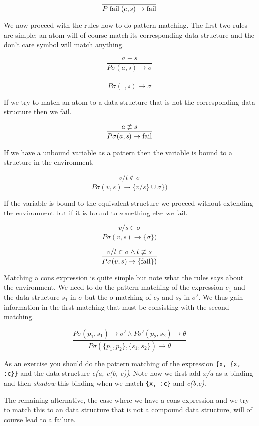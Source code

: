 \documentclass[a4paper,11pt]{article}
\begin{document}
$$\frac{}{P\;{\rm fail}\;(e, s) \rightarrow {\rm fail}}$$ 

We now proceed with the rules how to do pattern matching. The first
two rules are simple; an atom will of course match its corresponding
data structure and the don't care symbol will match anything.

$$\frac{a \equiv s}{P\sigma(a, s) \rightarrow \sigma}$$ 

$$\frac{}{P\sigma(\_,s) \rightarrow \sigma}$$

If we try to match an atom to a data structure that is not the
corresponding data structure then we fail.

$$\frac{a \not\equiv s}{P\sigma(a, s) \rightarrow {\rm fail}}$$ 

If we have a unbound variable as a pattern then the variable is bound to a
structure in the environment. 

$$\frac{v/t \not\in \sigma}{P\sigma(v, s) \rightarrow \lbrace v/s \rbrace \cup \sigma \rbrace) }$$ 

If the variable is bound to the equivalent structure we proceed
without extending the environment but if it is bound to something else
we fail.

$$\frac{v/s \in \sigma}{P\sigma(v, s) \rightarrow \lbrace \sigma \rbrace) }$$

$$\frac{v/t \in \sigma \wedge t \not\equiv s}{P\sigma(v, s) \rightarrow \lbrace {\rm fail} \rbrace) }$$ 

Matching a cons expression is quite simple but note what the rules
says about the environment. We need to do the pattern matching of the
expression $e_1$ and the data structure $s_1$ in $\sigma$ but the o
matching of $e_2$ and $s_2$ in $\sigma'$. We thus gain information in
the first matching that must be consisting with the second matching.

$$\frac{P\sigma(p_1, s_1) \rightarrow \sigma' \wedge P\sigma'(p_2, s_2) \rightarrow \theta}{P\sigma(\lbrace p_1, p_2 \rbrace  , \lbrace s_1, s_2 \rbrace) \rightarrow \theta}$$

As an exercise you should do the pattern matching of the expression
{\tt \{x, \{x, :c\}\}} and the data structure {\em c(a, c(b, c))}. Note
how we first add {\em x/a} as a binding and then {\em shadow} this binding when
we match {\tt \{x, :c\}} and {\em c(b,c)}.

The remaining alternative, the case where we have a cons expression and
we try to match this to an data structure that is not a compound data
structure, will of course lead to a failure.
\end{document}
